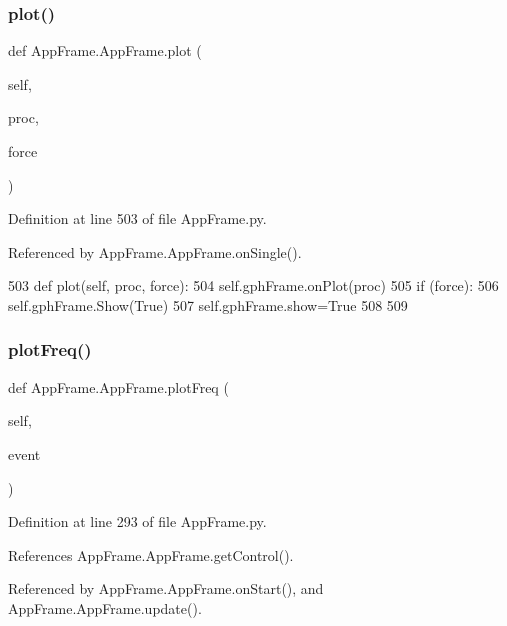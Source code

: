 \subsubsection{\texorpdfstring{plot()}{plot()}}
{\footnotesize\ttfamily def App\+Frame.\+App\+Frame.\+plot (\begin{DoxyParamCaption}\item[{}]{self,  }\item[{}]{proc,  }\item[{}]{force }\end{DoxyParamCaption})}



Definition at line 503 of file App\+Frame.\+py.



Referenced by App\+Frame.\+App\+Frame.\+on\+Single().


\begin{DoxyCode}
503     \textcolor{keyword}{def }plot(self, proc, force):
504         self.gphFrame.onPlot(proc)
505         \textcolor{keywordflow}{if} (force):
506             self.gphFrame.Show(\textcolor{keyword}{True})
507             self.gphFrame.show=\textcolor{keyword}{True}            
508 
509         
\end{DoxyCode}
\mbox{\label{classAppFrame_1_1AppFrame_a187376839e96a776ba48f2e294ee96f4}} 
\subsubsection{\texorpdfstring{plot\+Freq()}{plotFreq()}}
{\footnotesize\ttfamily def App\+Frame.\+App\+Frame.\+plot\+Freq (\begin{DoxyParamCaption}\item[{}]{self,  }\item[{}]{event }\end{DoxyParamCaption})}



Definition at line 293 of file App\+Frame.\+py.



References App\+Frame.\+App\+Frame.\+get\+Control().



Referenced by App\+Frame.\+App\+Frame.\+on\+Start(), and App\+Frame.\+App\+Frame.\+update().


